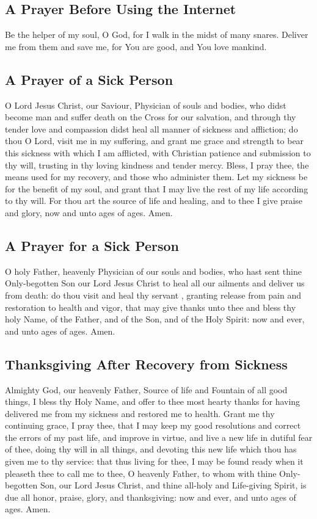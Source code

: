 \subsection{A Prayer Before Using the Internet}

Be the helper of my soul, O God, for I walk in the midst of many snares. Deliver me from them and save me, for You are good, and You love mankind.

\subsection{A Prayer of a Sick Person}

O Lord Jesus Christ, our Saviour, Physician of souls and bodies, who didst become man and suffer death on the Cross for our salvation, and through thy tender love and compassion didst heal all manner of sickness and affliction; do thou O Lord, visit me in my suffering, and grant me grace and strength to bear this sickness with which I am afflicted, with Christian patience and submission to thy will, trusting in thy loving kindness and tender mercy. Bless, I pray thee, the means used for my recovery, and those who administer them. Let my sickness be for the benefit of my soul, and grant that I may live the rest of my life according to thy will. For thou art the source of life and healing, and to thee I give praise and glory, now and unto ages of ages. Amen.

\subsection{A Prayer for a Sick Person}

O holy Father, heavenly Physician of our souls and bodies, who hast sent thine Only-begotten Son our Lord Jesus Christ to heal all our ailments and deliver us from death: do thou visit and heal thy servant , granting  release from pain and restoration to health and vigor, that  may give thanks unto thee and bless thy holy Name, of the Father, and of the Son, and of the Holy Spirit: now and ever, and unto ages of ages. Amen. 

\subsection{Thanksgiving After Recovery from Sickness}

Almighty God, our heavenly Father, Source of life and Fountain of all good things, I bless thy Holy Name, and offer to thee most hearty thanks for having delivered me from my sickness and restored me to health. Grant me thy continuing grace, I pray thee, that I may keep my good resolutions and correct the errors of my past life, and improve in virtue, and live a new life in dutiful fear of thee, doing thy will in all things, and devoting this new life which thou has given me to thy service: that thus living for thee, I may be found ready when it pleaseth thee to call me to thee, O heavenly Father, to whom with thine Only-begotten Son, our Lord Jesus Christ, and thine all-holy and Life-giving Spirit, is due all honor, praise, glory, and thanksgiving: now and ever, and unto ages of ages. Amen.

